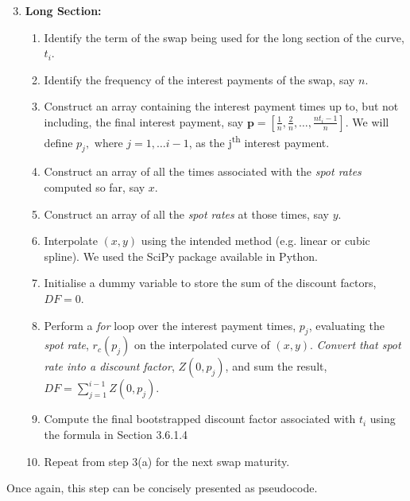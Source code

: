 \begin{enumerate}
    \setcounter{enumi}{2}
    \item \textbf{Long Section:}
    \begin{enumerate}
        \item Identify the term of the swap being used for the long section of the curve, $t_i$.
        \item Identify the frequency of the interest payments of the swap, say $n$.
        \item Construct an array containing the interest payment times up to, but not including, the final interest payment, say $\textbf{p} = \left[ \frac{1}{n}, \frac{2}{n}, \ldots, \frac{n t_i - 1}{n} \right]$. We will define $p_j, \text{ where } j = 1, \ldots i-1$, as the j\textsuperscript{th} interest payment.
        \item Construct an array of all the times associated with the \textit{spot rates} computed so far, say $x$.
        \item Construct an array of all the \textit{spot rates} at those times, say $y$.
        \item Interpolate $(x,y)$ using the intended method (e.g. linear or cubic spline). We used the SciPy package available in Python. 
        \item Initialise a dummy variable to store the sum of the discount factors, $DF = 0$.
        \item Perform a \textit{for} loop over the interest payment times, $p_j$, evaluating the \textit{spot rate}, $r_c(p_j)$ on the interpolated curve of $(x,y)$. \textit{Convert that spot rate into a discount factor}, $Z(0,p_j)$, and sum the result, $DF = \sum_{j=1}^{i-1} Z(0,p_j)$.
        \item Compute the final bootstrapped discount factor associated with $t_i$ using the formula in Section 3.6.1.4
        \item Repeat from step 3(a) for the next swap maturity.
    \end{enumerate}
\end{enumerate}

Once again, this step can be concisely presented as pseudocode.

